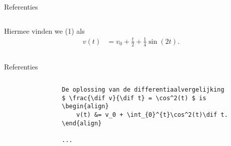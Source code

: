\begin{frame}[fragile,t]{Referenties}
\begin{columns}[t]
\begin{column}{0.5\textwidth}
\begin{onlyenv}
\begin{adjustbox}{frame=1pt 10pt,valign=t}
\begin{minipage}{\textwidth-22pt}
{                            %
                            Hiermee vinden we (1) als
                            \begin{align*}
                                v(t) & = v_0 + \frac{t}{2} + \frac{1}{4}\sin(2t).
                            \end{align*}
                        }%
                    \end{minipage}
                \end{adjustbox}
            \end{onlyenv}%
        \end{column}
    \end{columns}
\end{frame}

\begin{frame}[fragile,t]{Referenties}
    \begin{columns}[t]
        \begin{column}{0.5\textwidth}%
            \begin{verbatim}
                De oplossing van de differentiaalvergelijking
                $ \frac{\dif v}{\dif t} = \cos^2(t) $ is
                \begin{align}
                    v(t) &= v_0 + \int_{0}^{t}\cos^2(t)\dif t.
                \end{align}

                ...


\end{verbatim}
\end{column}
\end{columns}
\end{frame}
